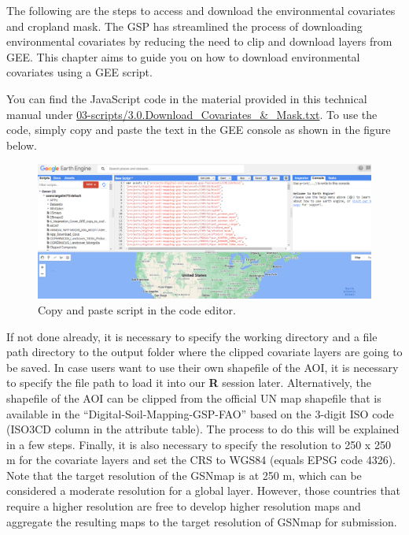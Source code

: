 \documentclass[
  10pt,
  b5paper,
  oneside]{book}
\begin{document}
The following are the steps to access and download the environmental covariates and cropland mask. The GSP has streamlined the process of downloading environmental covariates by reducing the need to clip and download layers from GEE. This chapter aims to guide you on how to download environmental covariates using a GEE script.

You can find the JavaScript code in the material provided in this technical manual under \href{https://github.com/FAO-GSP/GSNmap-TM/tree/main/Digital-Soil-Mapping/03-Scripts}{03-scripts/3.0.Download\_Covariates\_\&\_Mask.txt}. To use the code, simply copy and paste the text in the GEE console as shown in the figure below.

\begin{figure}
\includegraphics[width=25.68in]{images/javaScript_GEE} \caption{Copy and paste script in the code editor.}\label{fig:screenshot}
\end{figure}

If not done already, it is necessary to specify the working directory and a file path directory to the output folder where the clipped covariate layers are going to be saved. In case users want to use their own shapefile of the AOI, it is necessary to specify the file path to load it into our \textbf{R} session later. Alternatively, the shapefile of the AOI can be clipped from the official UN map shapefile that is available in the ``Digital-Soil-Mapping-GSP-FAO'' based on the 3-digit ISO code (ISO3CD column in the attribute table). The process to do this will be explained in a few steps. Finally, it is also necessary to specify the resolution to 250 x 250 m for the covariate layers and set the CRS to WGS84 (equals EPSG code 4326). Note that the target resolution of the GSNmap is at 250 m, which can be considered a moderate resolution for a global layer. However, those countries that require a higher resolution are free to develop higher resolution maps and aggregate the resulting maps to the target resolution of GSNmap for submission.
\end{document}
